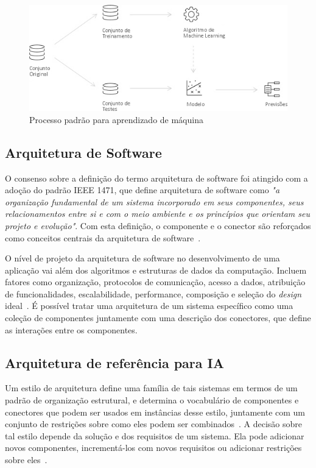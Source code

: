 \documentclass[portugues]{ic-tese}
\begin{document}
\begin{figure}[h]
\centering
\includegraphics[scale=0.6]{images/ML_Process.jpg}
\caption {Processo padrão para aprendizado de máquina}
\label{fig:MLProcess}
\end{figure}

\subsection{Arquitetura de Software}

O consenso sobre a definição do termo arquitetura de software foi atingido com a adoção do padrão IEEE 1471, que define arquitetura de software como \textit{"a organização fundamental de um sistema incorporado em seus componentes, seus relacionamentos entre si e com o meio ambiente e os princípios que orientam seu projeto e evolução"}. Com esta definição, o componente e o conector são reforçados como conceitos centrais da arquitetura de software~\citep{Bosch_2004}.

O nível de projeto da arquitetura de software no desenvolvimento de uma aplicação vai além dos algoritmos e estruturas de dados da computação. Incluem fatores como organização, protocolos de comunicação, acesso a dados, atribuição de funcionalidades, escalabilidade, performance, composição e seleção do \textit{design} ideal~\citep{Garlan_1993}. É possível tratar uma arquitetura de um sistema específico como uma coleção de componentes juntamente com uma descrição dos conectores, que define as interações entre os componentes.

\subsection{Arquitetura de referência para IA}

Um estilo de arquitetura define uma família de tais sistemas em termos de um padrão de organização estrutural, e determina o vocabulário de componentes e conectores que podem ser usados em instâncias desse estilo, juntamente com um conjunto de restrições sobre como eles podem ser combinados~\citep{Garlan_1993}. A decisão sobre tal estilo depende da solução e dos requisitos de um sistema. Ela pode adicionar novos componentes, incrementá-los com novos requisitos ou adicionar restrições sobre eles~\citep{Bosch_2004}.
\end{document}
